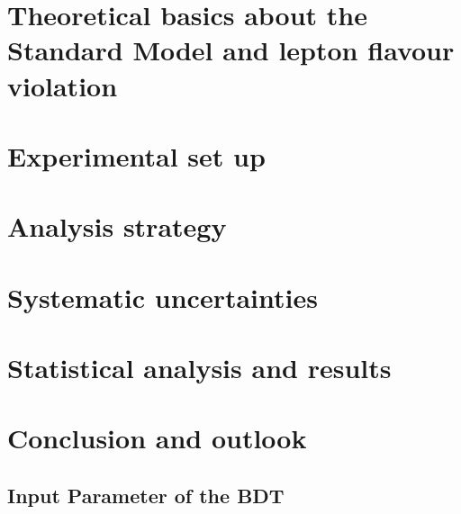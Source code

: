 \documentclass[12pt,twoside]{book}
\begin{document}

\clearpage{\pagestyle{empty}\cleardoublepage}

\tableofcontents
\thispagestyle{empty}
\clearpage{\pagestyle{empty}\cleardoublepage}

\listoffigures
\thispagestyle{empty}
\clearpage{\pagestyle{empty}\cleardoublepage}

\listoftables
\thispagestyle{empty}
\clearpage{\pagestyle{empty}\cleardoublepage}

\chapter{Theoretical basics about the Standard Model and lepton flavour violation}

\clearpage{\pagestyle{empty}\cleardoublepage}

\chapter{Experimental set up}

\clearpage{\pagestyle{empty}\cleardoublepage}

\chapter{Analysis strategy}

\clearpage{\pagestyle{empty}\cleardoublepage}

\chapter{Systematic uncertainties}

\clearpage{\pagestyle{empty}\cleardoublepage}

\chapter{Statistical analysis and results}

\clearpage{\pagestyle{empty}\cleardoublepage}

\chapter{Conclusion and outlook}

\clearpage{\pagestyle{empty}\cleardoublepage}

\begin{appendices}
	\chapter{Input Parameter of the BDT}
	\pagestyle{appendix}
	

\end{appendices}

\printglossaries

\pagestyle{bibliography}

  
\end{document}

